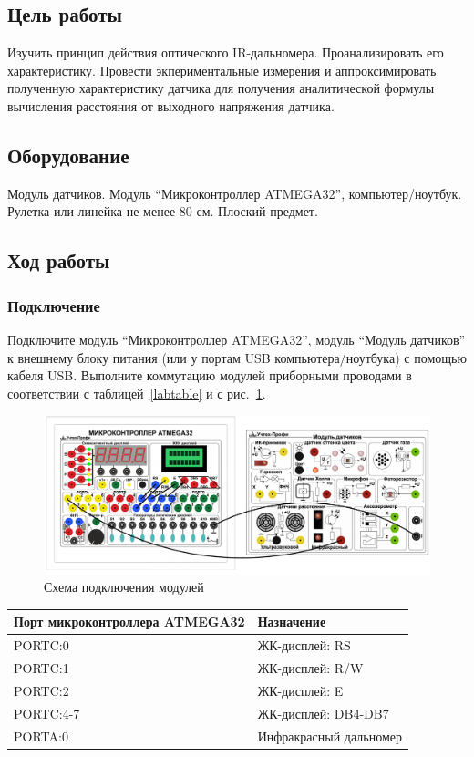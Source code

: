 \documentclass[12pt]{article}
\begin{document}
\subsection{Цель работы}
Изучить принцип действия оптического IR-дальномера. Проанализировать его характеристику. Провести экпериментальные измерения и аппроксимировать полученную характеристику датчика для получения аналитической формулы вычисления расстояния от выходного напряжения датчика.

\subsection{Оборудование}
Модуль датчиков. Модуль ``Микроконтроллер ATMEGA32'', компьютер/ноутбук. Рулетка или линейка не менее 80 см. Плоский предмет.

\subsection{Ход работы}
\subsubsection{Подключение}
Подключите модуль ``Микроконтроллер ATMEGA32'', модуль ``Модуль датчиков'' к внешнему блоку питания (или у портам USB компьютера/ноутбука) с помощью кабеля USB. Выполните коммутацию модулей приборными проводами в соответствии с таблицей~\ref{labtable}  и с рис.~\ref{labscheme}.

\begin{figure}[H]
    \centering
    \includegraphics[scale=0.65]{images/lab3-scheme.png}
    \caption{Схема подключения модулей}\label{labscheme}
\end{figure}
\begin{table}[H]
    \caption{Коммутация модулей}\label{labtable}
    \begin{longtable}[]{@{}l|l@{}}
        \toprule
        Порт микроконтроллера ATMEGA32 & Назначение \\
        \midrule
        \endhead
        PORTC:0 & ЖК-дисплей: RS \\
        PORTC:1 & ЖК-дисплей: R/W \\
        PORTC:2 & ЖК-дисплей: E \\
        PORTC:4-7 & ЖК-дисплей: DB4-DB7 \\
        PORTA:0 & Инфракрасный дальномер \\
        \bottomrule
    \end{longtable}  
\end{table}
\end{document}
